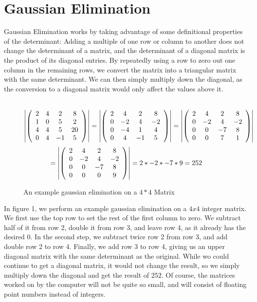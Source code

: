 \documentclass{article}
\begin{document}
\section{Gaussian Elimination}
Gaussian Elimination works by taking advantage of some definitional properties of the determinant: Adding a multiple of one row or column to another does not change the determinant of a matrix, and the determinant of a diagonal matrix is the product of its diagonal entries. By repeatedly using a row to zero out one column in the remaining rows, we convert the matrix into a triangular matrix with the same determinant. We can then simply multiply down the diagonal, as the conversion to a diagonal matrix would only affect the values above it. \\\\
\begin{figure}
$$
\left|\left(\begin{array}{cccc}
2&4&2&8\cr
1&0&5&2\cr
4&4&5&20\cr
0&4&-1&5\cr
\end{array} \right)\right|
=
\left|\left(\begin{array}{cccc}
2&4&2&8\cr
0&-2&4&-2\cr
0&-4&1&4\cr
0&4&-1&5\cr
\end{array} \right)\right|
=
\left|\left(\begin{array}{cccc}
2&4&2&8\cr
0&-2&4&-2\cr
0&0&-7&8\cr
0&0&7&1\cr
\end{array} \right)\right|
$$
$$
=
\left|\left(\begin{array}{cccc}
2&4&2&8\cr
0&-2&4&-2\cr
0&0&-7&8\cr
0&0&0&9\cr
\end{array} \right)\right|
=
2*-2*-7*9
=252
$$
\caption{An example gaussian elimination on a $4*4$ Matrix}
\end{figure}
In figure 1, we perform an example gaussian elimination on a $4x4$ integer matrix. We first use the top row to set the rest of the first column to zero. We subtract half of it from row 2, double it from row 3, and leave row 4, as it already has the desired $0$. In the second step, we subtract twice row 2 from row 3, and add double row 2 to row 4. Finally, we add row 3 to row 4, giving us an upper diagonal matrix with the same determinant as the original. While wo could continue to get a diagonal matrix, it would not change the result, so we simply multiply down the diagonal and get the result of 252. Of course, the matrices worked on by the computer will not be quite so small, and will consist of floating point numbers instead of integers.
\end{document}
